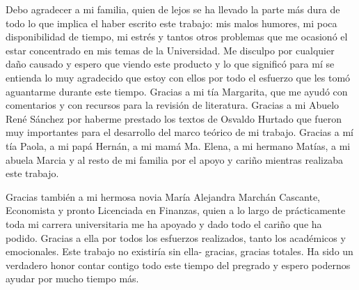 \documentclass[12pt,a4]{article}\usepackage[]{graphicx}\usepackage[]{xcolor}
\begin{document}
Debo agradecer a mi familia, quien de lejos se ha llevado la parte más dura de todo lo que implica el haber escrito este trabajo: mis malos humores, mi poca disponibilidad de tiempo, mi estrés y tantos otros problemas que me ocasionó el estar concentrado en mis temas de la Universidad. Me disculpo por cualquier daño causado y espero que viendo este producto y lo que significó para mí se entienda lo muy agradecido que estoy con ellos por todo el esfuerzo que les tomó aguantarme durante este tiempo. Gracias a mi tía Margarita, que me ayudó con comentarios y con recursos para la revisión de literatura. Gracias a mi Abuelo René Sánchez por haberme prestado los textos de Osvaldo Hurtado que fueron muy importantes para el desarrollo del marco teórico de mi trabajo. Gracias a mí tía Paola, a mi papá Hernán, a mi mamá Ma. Elena, a mi hermano Matías, a mi abuela Marcia y al resto de mi familia por el apoyo y cariño mientras realizaba este trabajo. 

Gracias también a mi hermosa novia María Alejandra Marchán Cascante, Economista y pronto Licenciada en Finanzas, quien a lo largo de prácticamente toda mi carrera universitaria me ha apoyado y dado todo el cariño que ha podido. Gracias a ella por todos los esfuerzos realizados, tanto los académicos y emocionales. Este trabajo no existiría sin ella- gracias, gracias totales. Ha sido un verdadero honor contar contigo todo este tiempo del pregrado y espero podernos ayudar por mucho tiempo más. 
\end{document}
